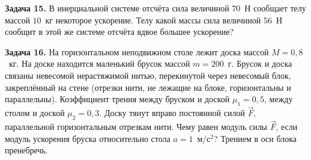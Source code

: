 
\begin{taskbasic}[code={\label{task:newton2_v20_n2}}]
\textbf{Задача 15.} В инерциальной системе отсчёта сила величиной $70$~Н сообщает телу массой $10$~кг некоторое ускорение. Телу какой массы сила величиной $56$~Н сообщит в этой же системе отсчёта вдвое большее ускорение?

\end{taskbasic}

\begin{taskbasic}[code={\label{task:newton2_v20_n26}}]
\textbf{Задача 16.} На горизонтальном неподвижном столе лежит доска массой $M=0{,}8$~кг. На доске находится маленький брусок массой $m=200$~г. Брусок и доска связаны невесомой нерастяжимой нитью, перекинутой через невесомый блок, закреплённый на стене (отрезки нити, не лежащие на блоке, горизонтальны и параллельны). Коэффициент трения между бруском и доской $\mu_1=0{,}5$, между столом и доской $\mu_2=0{,}3$. Доску тянут вправо постоянной силой $\vec{F}$, параллельной горизонтальным отрезкам нити. Чему равен модуль силы $\vec{F}$, если модуль ускорения бруска относительно стола $a=1$~м/с$^{2}$? Трением в оси блока пренебречь.

\nopagebreak\smallskip
\begin{center}
\end{center}
\end{taskbasic}
